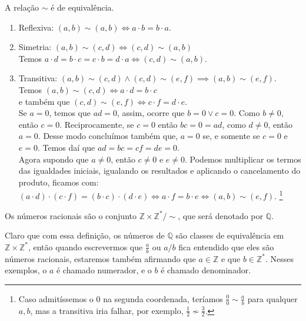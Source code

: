 \documentclass[../main.tex]{subfiles}
\begin{document}
\begin{teo}
    A relação $\sim$ é de equivalência.
\end{teo}
\begin{dem}
    \begin{enumerate}[label=(\roman*)]
        \item Reflexiva: $\left( a,b \right) \sim \left( a,b \right) \iff a  \cdot b=b  \cdot a$.
        \item Simetria: $ \left( a ,b \right) \sim \left( c,d \right) \iff \left( c,d \right) \sim \left( a,b \right) $ \\
        Temos $ a  \cdot d = b  \cdot c = c  \cdot b = d  \cdot a \iff \left( c,d \right) \sim \left( a,b \right) $.
        \item Transitiva: $ \left( a,b \right) \sim \left( c,d \right) \land \left( c,d \right) \sim \left( e,f \right) \implies \left( a,b \right) \sim \left( e,f \right)$. \\
        Temos $\left( a,b \right) \sim \left( c,d \right) \iff a  \cdot d=b  \cdot c$ \\
        e também que $\left( c,d \right) \sim \left( e,f \right) \iff c  \cdot f=d  \cdot e$. \\
        Se $a=0$, temos que $ad = 0$, assim, ocorre que $b=0 \lor c=0$. Como $b \neq 0$, então $c=0$. Reciprocamente, se $c=0$ então $bc = 0 = ad$, como $d \neq 0$, então $a=0$. Desse modo concluímos também que, $a=0$ se, e somente se $c=0$ e $e=0$. Temos daí que $ad = bc = cf = de = 0$. \\
        Agora supondo que $a \neq 0$, então $c \neq 0$ e $e \neq 0$.
        Podemos multiplicar os termos das igualdades iniciais, igualando os resultados e aplicando o cancelamento do produto, ficamos com: \\ 
        $\left( a  \cdot d \right)  \cdot \left( c  \cdot f \right)= \left(b  \cdot c\right)  \cdot \left(d  \cdot e\right) \iff a  \cdot f = b  \cdot e \iff \left( a,b \right) \sim \left( e,f \right)$. \footnote{Caso admitíssemos o $0$ na segunda coordenada, teríamos $\frac{0}{0} \sim \frac{a}{b}$ para qualquer $a,b$, mas a transitiva iria falhar, por exemplo, $\frac{1}{2} \not\sim \frac{3}{2}$.}\label{rac-just-zeroDenominador}
    \end{enumerate}
\end{dem}

\begin{defi}
   Os números racionais são o conjunto $\mathbb{Z} \times \mathbb{Z}^* / \sim$, que será denotado por $\mathbb{Q}$.
\end{defi}
Claro que com essa definição, os números de $\mathbb{Q}$ são classes de equivalência em $\mathbb{Z} \times \mathbb{Z}^*$, então quando escrevermos que $\frac{a}{b}$ ou $a/b$ fica entendido que eles são números racionais, estaremos também afirmando que $a \in \mathbb{Z}$ e que $b \in \mathbb{Z}^*$. Nesses exemplos, o $a$ é chamado numerador, e o $b$ é chamado denominador.
\end{document}
